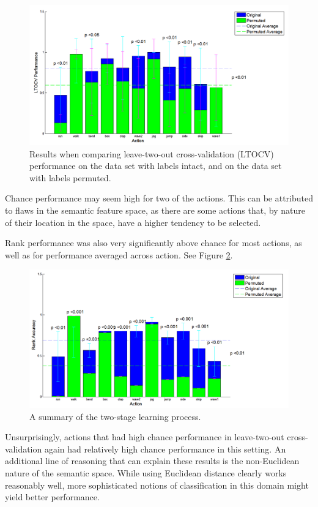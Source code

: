 \documentclass{article}
\begin{document}
\begin{figure}[h]
  \centering
  \includegraphics[width=\linewidth]{ltocv_snap_new}
  \caption{Results when comparing leave-two-out cross-validation (LTOCV) performance on the data set with labels intact, and on the data set with labels permuted.}
  \label{ltocvplot}
\end{figure}

Chance performance may seem high for two of the actions. This can be attributed to flaws in the semantic feature space, as there are some actions that, by nature of their location in the space, have a higher tendency to be selected.

Rank performance was also very significantly above chance for most actions, as well as for performance averaged across action. See Figure \ref{rankplot}. 

\begin{figure}[h]
  \centering
  \includegraphics[width=\linewidth]{rank_snap_new}
  \caption{A summary of the two-stage learning process.}
  \label{rankplot}
\end{figure}

Unsurprisingly, actions that had high chance performance in leave-two-out cross-validation again had relatively high chance performance in this setting. An additional line of reasoning that can explain these results is the non-Euclidean nature of the semantic space. While using Euclidean distance clearly works reasonably well, more sophisticated notions of classification in this domain might yield better performance.
\end{document}
